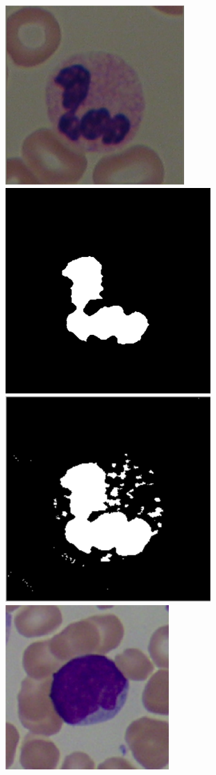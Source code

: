 \documentclass[final,a4paper,12pt,english]{UnicaPhdThesis3}
\begin{document}
\begin{figure}[!b]
		\hspace{1.3mm}\includegraphics[height=0.10\textheight]{images/2015_1_caip/2-1}
		\includegraphics[height=0.10\textheight]{images/2015_1_caip/2-3}
		\includegraphics[height=0.10\textheight]{images/2015_1_caip/2-4}
		\includegraphics[height=0.10\textheight]{images/2015_1_caip/4-1}

\end{figure}
\end{document}
